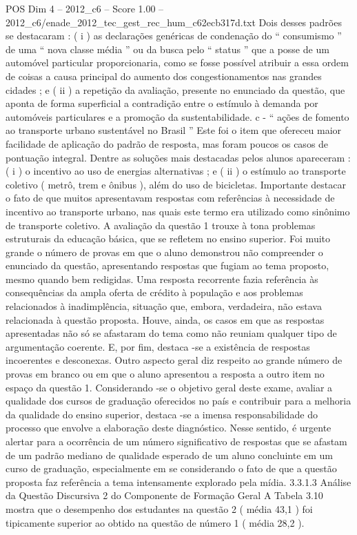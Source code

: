 \begin{textsample}{POS Dim 4 – 2012\_c6 – Score 1.00 – 2012\_c6/enade\_2012\_tec\_gest\_rec\_hum\_c62ecb317d.txt}
Dois desses padrões se destacaram : ( i ) as declarações genéricas de condenação do “ consumismo ” de uma “ nova classe média ” ou da busca pelo “ status ” que a posse de um automóvel particular proporcionaria, como se fosse possível atribuir a essa ordem de coisas a causa principal do aumento dos congestionamentos nas grandes cidades ; e ( ii ) a repetição da avaliação, presente no enunciado da questão, que aponta de forma superficial a contradição entre o estímulo à demanda por automóveis particulares e a promoção da sustentabilidade. c - “ ações de fomento ao transporte urbano sustentável no Brasil ” Este foi o item que ofereceu maior facilidade de aplicação do padrão de resposta, mas foram poucos os casos de pontuação integral.
Dentre as soluções mais destacadas pelos alunos apareceram : ( i ) o incentivo ao uso de energias alternativas ; e ( ii ) o estímulo ao transporte coletivo ( metrô, trem e ônibus ), além do uso de bicicletas.
Importante destacar o fato de que muitos apresentavam respostas com referências à necessidade de incentivo ao transporte urbano, nas quais este termo era utilizado como sinônimo de transporte coletivo.
A avaliação da questão 1 trouxe à tona problemas estruturais da educação básica, que se refletem no ensino superior.
Foi muito grande o número de provas em que o aluno demonstrou não compreender o enunciado da questão, apresentando respostas que fugiam ao tema proposto, mesmo quando bem redigidas.
Uma resposta recorrente fazia referência às consequências da ampla oferta de crédito à população e aos problemas relacionados à inadimplência, situação que, embora, verdadeira, não estava relacionada à questão proposta.
Houve, ainda, os casos em que as respostas apresentadas não só se afastaram do tema como não reuniam qualquer tipo de argumentação coerente.
E, por fim, destaca -se a existência de respostas incoerentes e desconexas.
Outro aspecto geral diz respeito ao grande número de provas em branco ou em que o aluno apresentou a resposta a outro item no espaço da questão 1.
Considerando -se o objetivo geral deste exame, avaliar a qualidade dos cursos de graduação oferecidos no país e contribuir para a melhoria da qualidade do ensino superior, destaca -se a imensa responsabilidade do processo que envolve a elaboração deste diagnóstico.
Nesse sentido, é urgente alertar para a ocorrência de um número significativo de respostas que se afastam de um padrão mediano de qualidade esperado de um aluno concluinte em um curso de graduação, especialmente em se considerando o fato de que a questão proposta faz referência a tema intensamente explorado pela mídia. 3.3.1.3 Análise da Questão Discursiva 2 do Componente de Formação Geral A Tabela 3.10 mostra que o desempenho dos estudantes na questão 2 ( média 43,1 ) foi tipicamente superior ao obtido na questão de número 1 ( média 28,2 ).

\end{textsample}
